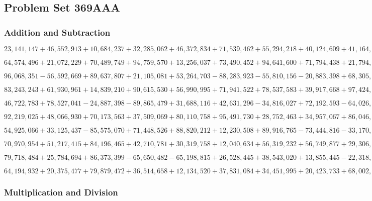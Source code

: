 \hypertarget{problem-set-369aaa}{%
\subsection{Problem Set 369AAA}\label{problem-set-369aaa}}

\hypertarget{addition-and-subtraction}{%
\subsubsection{Addition and
Subtraction}\label{addition-and-subtraction}}

\(23,141,147+46,552,913+10,684,237+32,285,062+46,372,834+71,539,462+55,294,218+40,124,609+41,164,920+72,310,088\)

\(64,574,496+21,072,229+70,489,749+94,759,570+13,256,037+73,490,452+94,641,600+71,794,438+21,794,605+11,910,440\)

\(96,068,351-56,592,669+89,637,807+21,105,081+53,264,703-88,283,923-55,810,156-20,883,398+68,305,805+80,981,893\)

\(83,243,243+61,930,961+14,839,210+90,615,530+56,990,995+71,941,522+78,537,583+39,917,668+97,424,820+61,920,260\)

\(46,722,783+78,527,041-24,887,398-89,865,479+31,688,116+42,631,296-34,816,027+72,192,593-64,026,176+56,362,287\)

\(92,219,025+48,066,930+70,173,563+37,509,069+80,110,758+95,491,730+28,752,463+34,957,067+86,046,989+50,186,259\)

\(54,925,066+33,125,437-85,575,070+71,448,526+88,820,212+12,230,508+89,916,765-73,444,816-33,170,902-70,003,641\)

\(70,970,954+51,217,415+84,196,465+42,710,781+30,319,758+12,040,634+56,319,232+56,749,877+29,306,158+24,360,079\)

\(79,718,484+25,784,694+86,373,399-65,650,482-65,198,815+26,528,445+38,543,020+13,855,445-22,318,549-99,071,152\)

\(64,194,932+20,375,477+79,879,472+36,514,658+12,134,520+37,831,084+34,451,995+20,423,733+68,002,091+47,194,963\)

\hypertarget{multiplication-and-division}{%
\subsubsection{Multiplication and
Division}\label{multiplication-and-division}}

